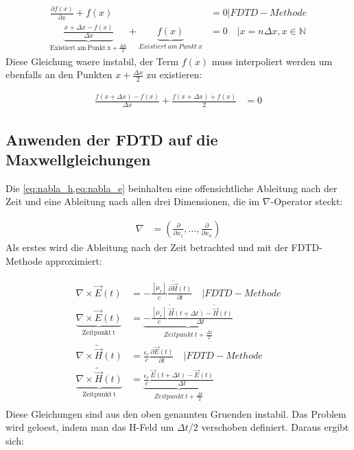 \documentclass[11pt, ngerman]{article}
\begin{document}
\begin{align}
	\frac{\partial f(x)}{\partial x} + f(x) &= 0 \vert FDTD-Methode \\
	\underbrace{\frac{x + \Delta x - f(x)}{\Delta x}}_{\mathrm{Existiert\ am\ Punkt\ x + \frac{\Delta x}{2}}} + \underbrace{f(x)}_{Existiert\ am\ Punkt\ x} &= 0\quad\vert x = n\Delta x, x \in \mathbb{N}  
\end{align}
Diese Gleichung waere instabil, der Term \(f(x)\) muss interpoliert werden um ebenfalls
an den Punkten \(x + \frac{\Delta x}{2}\) zu existieren:

\begin{align}
	\frac{f(x + \Delta x) - f(x)}{\Delta x} + \frac{f(x + \Delta x) + f(x)}{2} &= 0
\end{align}

\subsection{Anwenden der FDTD auf die Maxwellgleichungen}
Die \cref{eq:nabla_h,eq:nabla_e} beinhalten eine offensichtliche Ableitung nach
der Zeit und eine Ableitung nach allen drei Dimensionen, die im \(\nabla\)-Operator
steckt:

\begin{align}
	\nabla &= (\frac{\partial}{\partial x_1}, \ldots, \frac{\partial}{\partial x_n})
\end{align}
Als erstes wird die Ableitung nach der Zeit betrachted und mit der FDTD-Methode approximiert:

\begin{align}
	\nabla\times\vec{E}(t) &= -\frac{[\mu_r]}{c}\frac{\partial\widetilde{\vec{H}}(t)}{\partial t}\quad\vert FDTD-Methode \\
	\underbrace{\nabla\times\vec{E}(t)}_{\mathrm{Zeitpunkt\ t}} &= \underbrace{-\frac{[\mu_r]}{c}\frac{\widetilde{\vec{H}}(t+\Delta t)-\widetilde{\vec{H}}(t)}{\Delta t}}_{Zeitpunkt\ t+\frac{\Delta t}{2}} \\
	\nabla\times\widetilde{\vec{H}}(t) &= \frac{\epsilon_r}{c}\frac{\partial\vec{E}(t)}{\partial t}\quad\vert FDTD-Methode \\
	\underbrace{\nabla\times\widetilde{\vec{H}}(t)}_{\mathrm{Zeitpunkt\ t}} &= \underbrace{\frac{\epsilon_r}{c}\frac{\vec{E}(t+\Delta t)-\vec{E}(t)}{\Delta t}}_{Zeitpunkt\ t+\frac{\Delta t}{2}}\\
\end{align}
Diese Gleichungen sind aus den oben genannten Gruenden instabil. Das Problem wird geloest, indem man das 
H-Feld um \(\Delta t/2\) verschoben definiert.\cite{approximation_time}
Daraus ergibt sich:
\end{document}
